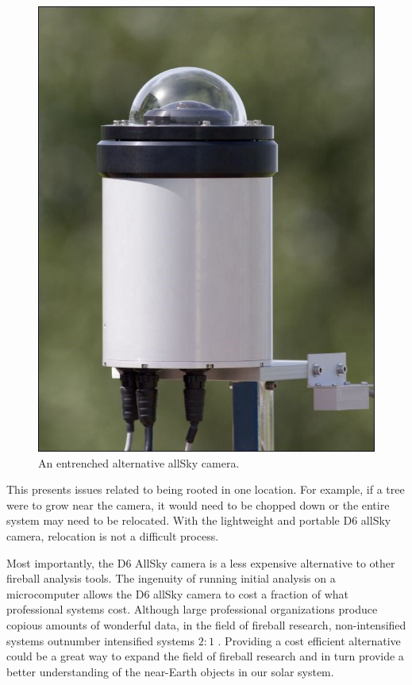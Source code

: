 \begin{figure}[ht!]
  \centering
  \includegraphics[scale=0.3]{images/othercam.jpg}
  \caption{An entrenched alternative allSky camera.}
  \label{immobile}
\end{figure}

This presents issues related to being rooted in one location.
For example, if a tree were to grow near the camera, it would need to be chopped down or the entire system may need to be relocated.
With the lightweight and portable D6 allSky camera, relocation is not a difficult process.

Most importantly, the D6 AllSky camera is a less expensive alternative to other fireball analysis tools. 
The ingenuity of running initial analysis on a microcomputer allows the D6 allSky camera to cost a fraction of what professional systems cost.
Although large professional organizations produce copious amounts of wonderful data, in the field of fireball research, non-intensified systems outnumber intensified systems $2:1$ \cite{gural_review_2005}.  
Providing a cost efficient alternative could be a great way to expand the field of fireball research and in turn provide a better understanding of the near-Earth objects in our solar system.


